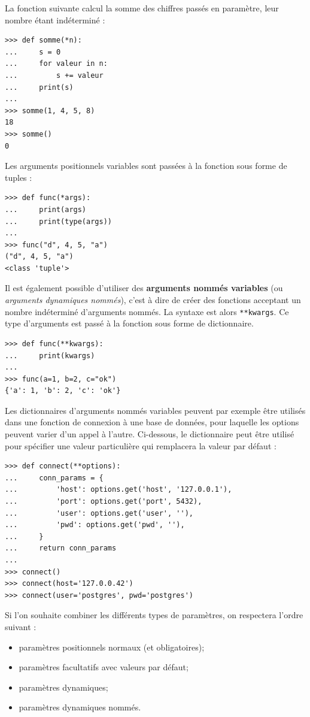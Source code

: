 \documentclass[12pt, a4paper]{article}
\begin{document}
La fonction suivante calcul la somme des chiffres passés en paramètre, leur nombre étant indéterminé :
\begin{lstlisting}
>>> def somme(*n):
...     s = 0
...     for valeur in n:
...         s += valeur
...     print(s)
...
>>> somme(1, 4, 5, 8)
18
>>> somme()
0
\end{lstlisting}

Les arguments positionnels variables sont passées à la fonction sous forme de tuples :
\begin{lstlisting}
>>> def func(*args):
...     print(args)
...     print(type(args))
...
>>> func("d", 4, 5, "a")
("d", 4, 5, "a")
<class 'tuple'>
\end{lstlisting}

Il est également possible d'utiliser des \textbf{arguments nommés variables} (ou \textit{arguments dynamiques nommés}), c'est à dire de créer des fonctions acceptant un nombre indéterminé d'arguments nommés. La syntaxe est alors \lstinline{**kwargs}. Ce type d'arguments est passé à la fonction sous forme de dictionnaire.
\begin{lstlisting}
>>> def func(**kwargs):
...     print(kwargs)
...
>>> func(a=1, b=2, c="ok")
{'a': 1, 'b': 2, 'c': 'ok'}
\end{lstlisting}

Les dictionnaires d'arguments nommés variables peuvent par exemple être utilisés dans une fonction de connexion à une base de données, pour laquelle les options peuvent varier d'un appel à l'autre. Ci-dessous, le dictionnaire peut être utilisé pour spécifier une valeur particulière qui remplacera la valeur par défaut :
\begin{lstlisting}
>>> def connect(**options):
...     conn_params = {
...         'host': options.get('host', '127.0.0.1'),
...         'port': options.get('port', 5432),
...         'user': options.get('user', ''),
...         'pwd': options.get('pwd', ''),
...     }
...     return conn_params
...
>>> connect()
>>> connect(host='127.0.0.42')
>>> connect(user='postgres', pwd='postgres')
\end{lstlisting}

Si l'on souhaite combiner les différents types de paramètres, on respectera l'ordre suivant : 
\begin{itemize}
	\item paramètres positionnels normaux (et obligatoires);
	\item paramètres facultatifs avec valeurs par défaut;
	\item paramètres dynamiques;
	\item paramètres dynamiques nommés.
\end{itemize}
\end{document}
